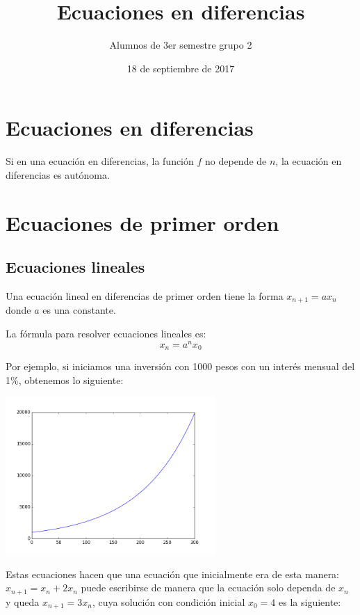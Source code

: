 \documentclass{article}
\title{Ecuaciones en diferencias}
\author{Alumnos de 3er semestre grupo 2}
\date{18 de septiembre de 2017}
\begin{document}
\maketitle

\section{Ecuaciones en diferencias}
\label{sec:ecuaciones}


Si en una ecuación en diferencias, la función $f$ no depende de $n$,
la ecuación en diferencias es autónoma.

\section{Ecuaciones de primer orden}

\subsection{Ecuaciones lineales}

Una ecuación lineal en diferencias de primer orden tiene la forma
$x_{n+1}=ax_n$ donde $a$ es una constante.

La fórmula para resolver ecuaciones lineales es:
\begin{equation}
  \label{lineal}
  x_n=a^nx_0
\end{equation}

Por ejemplo, si iniciamos una inversión con 1000 pesos con un interés
mensual del 1\%, obtenemos lo siguiente:

\begin{center}
  \includegraphics[width=8cm]{inversion.png}
\end{center}

Estas ecuaciones hacen que una ecuación que inicialmente era de esta
manera: $x_{n+1}=x_n+2x_n$ puede escribirse de manera que la ecuación
solo dependa de $x_n$ y queda $x_{n+1}=3x_n$, cuya solución con
condición inicial $x_0=4$ es la siguiente:
\end{document}
